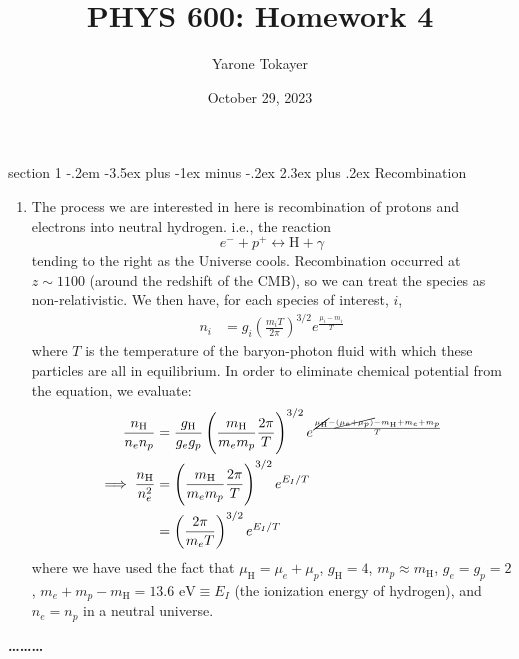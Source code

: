 \documentclass[12pt]{article}
\makeatletter
\newenvironment{problem}{\@startsection
	{section}
	{1}
	{-.2em}
	{-3.5ex plus -1ex minus -.2ex}
	{2.3ex plus .2ex}
	{\pagebreak[3]%
		\large\bf\noindent{Problem }
	}
}
{%
	\begin{center}\large\bf \ldots\ldots\ldots\end{center}}
\makeatother
\begin{document}
	
	\title{PHYS 600: Homework 4}
	\author{Yarone Tokayer}
	\date{October 29, 2023}
	
	\maketitle
	
	\thispagestyle{empty}

	\begin{problem}{Recombination}
		\begin{enumerate}
			\item The process we are interested in here is recombination of protons and electrons into neutral hydrogen.  i.e., the reaction \begin{equation*}
				e^- + p^+ \leftrightarrow \mathrm{H} + \gamma
			\end{equation*} tending to the right as the Universe cools.  Recombination occurred at $z\sim 1100$ (around the redshift of the CMB), so we can treat the species as non-relativistic.  We then have, for each species of interest, $i$, \begin{align*}
				n_i &= g_i \left(\frac{m_i T}{2\pi}\right)^{3/2}e^\frac{\mu_i-m_i}{T}
			\end{align*} where $T$ is the temperature of the baryon-photon fluid with which these particles are all in equilibrium.  In order to eliminate chemical potential from the equation, we evaluate: \begin{align}
				\frac{n_\mathrm{H}}{n_en_p} &= \frac{g_\mathrm{H}}{g_eg_p} \left( \frac{m_\mathrm{H}}{m_em_p} \frac{ 2\pi}{T}\right)^{3/2} e^\frac{\cancel{\mu_\mathrm{H}} - \cancel{(\mu_e+\mu_p)} - m_\mathrm{H} + m_e + m_p}{T} \notag
				\\
				\implies \frac{n_\mathrm{H}}{n_e^2} &= \left( \frac{m_\mathrm{H}}{m_em_p} \frac{ 2\pi}{T}\right)^{3/2} e^{E_I/T} \notag
				\\
				&= \left( \frac{ 2\pi}{m_eT}\right)^{3/2} e^{E_I/T}  \label{eq:n_h/n_e^2}
			\end{align} where we have used the fact that $\mu_\mathrm{H} = \mu_e + \mu_p$, $g_\mathrm{H} = 4$, $m_p\approx m_\mathrm{H}$, $g_e = g_p = 2$, $m_e + m_p - m_\mathrm{H} = 13.6 \text{ eV} \equiv E_I$ (the ionization energy of hydrogen), and $n_e = n_p$ in a neutral universe.\\
			

\end{enumerate}
\end{problem}
\end{document}
